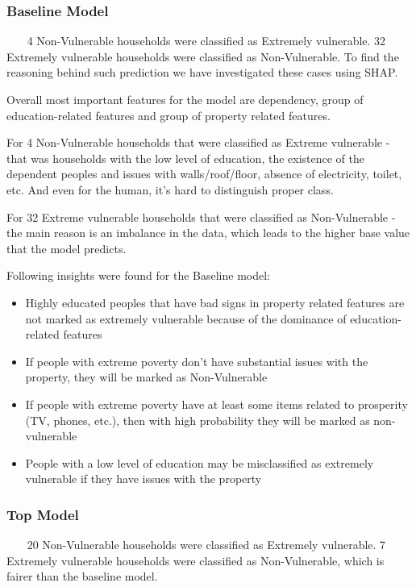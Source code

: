     \subsubsection{Baseline Model}~~~
        4 Non-Vulnerable households were classified as Extremely vulnerable. 32 Extremely vulnerable households were classified as Non-Vulnerable. To find the reasoning behind such prediction we have investigated these cases using SHAP.
        
        Overall most important features for the model are dependency, group of education-related features and group of property related features.
        
        For 4 Non-Vulnerable households that were classified as Extreme vulnerable - that was households with the low level of education, the existence of the dependent peoples and issues with walls/roof/floor, absence of electricity, toilet, etc. And even for the human, it's hard to distinguish proper class.
        
        For 32 Extreme vulnerable households that were classified as Non-Vulnerable - the main reason is an imbalance in the data, which leads to the higher base value that the model predicts. 
        
        Following insights were found for the Baseline model:
        \begin{itemize}
            \item Highly educated peoples that have bad signs in property related features are not marked as extremely vulnerable because of the dominance of education-related features
            \item If people with extreme poverty don't have substantial issues with the property, they will be marked as Non-Vulnerable
            \item If people with extreme poverty have at least some items related to prosperity (TV, phones, etc.), then with high probability they will be marked as non-vulnerable
            \item People with a low level of education may be misclassified as extremely vulnerable if they have issues with the property
        \end{itemize}
        
    \subsubsection{Top Model}~~~
        20 Non-Vulnerable households were classified as Extremely vulnerable. 7 Extremely vulnerable households were classified as Non-Vulnerable, which is fairer than the baseline model.


